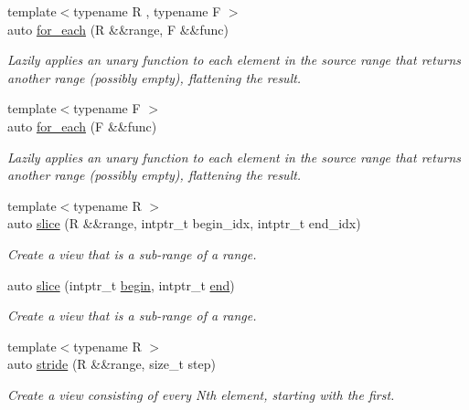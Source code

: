 \begin{DoxyCompactItemize}
{\footnotesize template$<$typename R , typename F $>$ }\\auto \mbox{\hyperlink{namespacerah_1_1view_aeecb42c8a3ea83ad0c50ca3b74a8d62c}{for\+\_\+each}} (R \&\&range, F \&\&func)
\begin{DoxyCompactList}\small\item\em Lazily applies an unary function to each element in the source range that returns another range (possibly empty), flattening the result. \end{DoxyCompactList}\item 
{\footnotesize template$<$typename F $>$ }\\auto \mbox{\hyperlink{namespacerah_1_1view_a86a39630c0b54bab115c18fe1d42847c}{for\+\_\+each}} (F \&\&func)
\begin{DoxyCompactList}\small\item\em Lazily applies an unary function to each element in the source range that returns another range (possibly empty), flattening the result. \end{DoxyCompactList}\item 
{\footnotesize template$<$typename R $>$ }\\auto \mbox{\hyperlink{namespacerah_1_1view_a419374b95b3b9601655b0edf753963c3}{slice}} (R \&\&range, intptr\+\_\+t begin\+\_\+idx, intptr\+\_\+t end\+\_\+idx)
\begin{DoxyCompactList}\small\item\em Create a view that is a sub-\/range of a range. \end{DoxyCompactList}\item 
auto \mbox{\hyperlink{namespacerah_1_1view_af2baef5b0078f0768cbfee4aae4e9924}{slice}} (intptr\+\_\+t \mbox{\hyperlink{namespacerah_acccec48f25fb1a805854818f05d7b616}{begin}}, intptr\+\_\+t \mbox{\hyperlink{namespacerah_a20a3e45aee90bb5534a00c6b14e06069}{end}})
\begin{DoxyCompactList}\small\item\em Create a view that is a sub-\/range of a range. \end{DoxyCompactList}\item 
{\footnotesize template$<$typename R $>$ }\\auto \mbox{\hyperlink{namespacerah_1_1view_a112a1a8d31435c1070c4cd98cc02d96a}{stride}} (R \&\&range, size\+\_\+t step)
\begin{DoxyCompactList}\small\item\em Create a view consisting of every Nth element, starting with the first. \end{DoxyCompactList}\item 

\end{DoxyCompactItemize}
